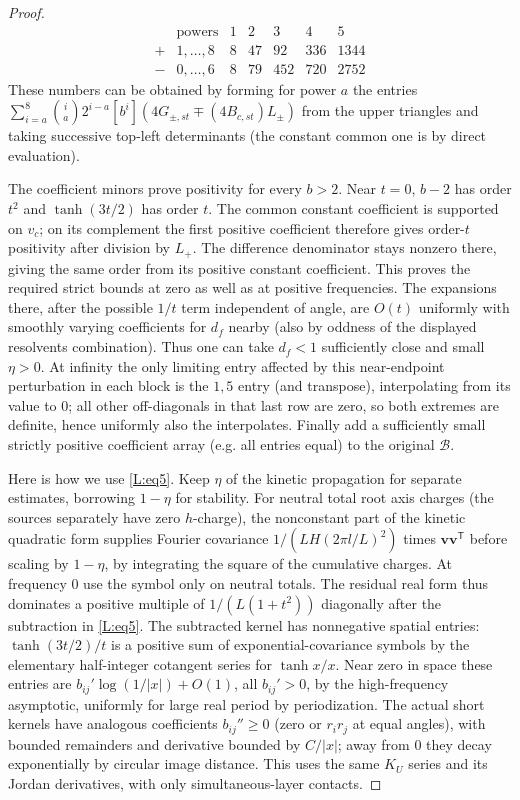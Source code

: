 \begin{proof}
\[
\begin{array}{c|c|rrrrr}
 &\text{powers}&1&2&3&4&5\\\hline
 +&1,\ldots,8&8&47&92&336&1344\\
 -&0,\ldots,6&8&79&452&720&2752
\end{array}
\]
These numbers can be obtained by forming for power \(a\) the entries \(\sum_{i=a}^{8}\binom ia 2^{i-a} [b^i](4G_{\pm,st}\mp (4 B_{c,st})L_\pm)\) from the upper triangles and taking successive top-left determinants (the constant common one is by direct evaluation).

The coefficient minors prove positivity for every $b>2$.
Near $t=0$, $b-2$ has order $t^2$ and $\tanh(3t/2)$ has order $t$.
The common constant coefficient is supported on $v_c$; on its
complement the first positive coefficient therefore gives order-$t$
positivity after division by $L_+$. The difference denominator stays
nonzero there, giving the same order from its positive constant
coefficient. This proves the required strict bounds at zero as well as
at positive frequencies. The expansions there, after the possible \(1/t\) term independent of angle, are \(O(t)\) uniformly with smoothly varying coefficients for \(d_f\) nearby (also by oddness of the displayed resolvents combination). Thus one can take \(d_f<1\) sufficiently close and small \(\eta>0\). At infinity the only limiting entry affected by this near-endpoint perturbation in each block is the \(1,5\) entry (and transpose), interpolating from its value to 0; all other off-diagonals in that last row are zero, so both extremes are definite, hence uniformly also the interpolates. Finally add a sufficiently small strictly positive coefficient array (e.g. all entries equal) to the original \(\mathscr B\).

Here is how we use \eqref{L:eq5}. Keep \(\eta\) of the kinetic propagation for separate estimates, borrowing \(1-\eta\) for stability. For neutral total root axis charges (the sources separately have zero \(h\)-charge), the nonconstant part of the kinetic quadratic form supplies Fourier covariance \(1/(LH(2\pi l/L)^2)\) times \(\mathbf v\mathbf v^{\mathsf T}\) before scaling by \(1-\eta\), by integrating the square of the cumulative charges. At frequency 0 use the symbol only on neutral totals. The residual real form thus dominates a positive multiple of \(1/(L(1+t^2))\) diagonally after the subtraction in \eqref{L:eq5}. The subtracted kernel has nonnegative spatial entries: \(\tanh(3t/2)/t\) is a positive sum of exponential-covariance symbols by the elementary half-integer cotangent series for \(\tanh x/x\). Near zero in space these entries are \(b_{ij}'\log(1/|x|)+O(1)\), all \(b_{ij}'>0\), by the high-frequency asymptotic, uniformly for large real period by periodization. The actual short kernels have analogous coefficients \(b_{ij}''\ge0\) (zero or \(r_i r_j\) at equal angles), with bounded remainders and derivative bounded by \(C/|x|\); away from 0 they decay exponentially by circular image distance. This uses the same \(K_U\) series and its Jordan derivatives, with only simultaneous-layer contacts.


\end{proof}
